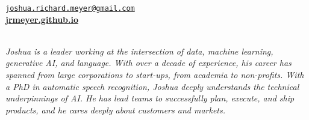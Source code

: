 \documentclass{cv} %
\begin{document}
\vspace{-.25cm}
\begin{center}
\href{mailto:joshua.richard.meyer@gmail.com}{\nolinkurl{joshua.richard.meyer@gmail.com}}\\
\vspace{.15cm}
\href{https://jrmeyer.github.io}{\textbf{jrmeyer.github.io}} \\
\vspace{.15cm}
 \href{https://www.linkedin.com/in/josh-r-meyer/}{\faLinkedin} \hspace{.25cm} \href{https://github.com/JRMeyer}{\faGithub} \hspace{.25cm} \href{https://wa.me/14155899933}{\faWhatsapp} \\

\vspace{.5cm}

\textit{Joshua is a leader working at the intersection of data, machine learning, generative AI, and language. With over a decade of experience, his career has spanned from large corporations to start-ups, from academia to non-profits. With a PhD in automatic speech recognition, Joshua deeply understands the technical underpinnings of AI. He has lead teams to successfully plan, execute, and ship products, and he cares deeply about customers and markets.}

\vspace{.5cm}

\end{center}


\vspace{.25cm}
\end{document}
